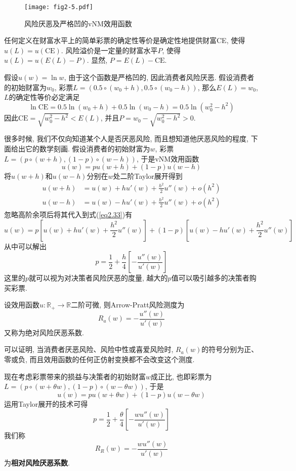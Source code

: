 \documentclass[cn, 12pt, math=mtpro2, bibstyle=apa, blue]{elegantbook}
\newcommand{\R}{\mathbb{R}}
\begin{document}
\begin{figure}[htbp!]
  \centering
  \texttt{[image: fig2-5.pdf]}
  \caption{风险厌恶及严格凹的vNM效用函数}\label{fig2.5}
\end{figure}

\begin{definition}[确定性等价与风险溢价]
任何定义在财富水平上的简单彩票的确定性等价是确定性地提供财富CE, 使得$u(L)=u(\text{CE})$. 风险溢价是一定量的财富水平$P$, 使得$u(L)=u(E(L)-P)$. 显然, $P=E(L)-\text{CE}$.
\end{definition}

\begin{example}
假设$u(w)=\ln w$, 由于这个函数是严格凹的, 因此消费者风险厌恶. 假设消费者的初始财富为$w_0$, 彩票$L=(0.5\circ (w_0+h), 0.5\circ (w_0-h))$, 那么$E(L)=w_0$, $L$的确定性等价必定满足
$$\ln \text{CE}=0.5\ln (w_0+h)+0.5\ln (w_0-h)=0.5\ln (w_0^2-h^2)$$
因此$\text{CE}=\sqrt{w_0^2-h^2}<E(L)$, 并且$P=w_0-\sqrt{w_0^2-h^2}>0$.
\end{example}

很多时候, 我们不仅向知道某个人是否厌恶风险, 而且想知道他厌恶风险的程度, 下面给出它的数学刻画. 假设消费者的初始财富为$w$, 彩票$L=(p\circ (w+h), (1-p)\circ (w-h))$, 于是vNM效用函数
\begin{equation}\label{eq2.33}
  u(w)=pu(w+h)+(1-p)u(w-h)
\end{equation}
将$u(w+h)$和$u(w-h)$分别在$w$处二阶Taylor展开得到
\begin{align*}
u(w+h)&=u(w)+hu'(w)+\frac{h^2}{2}u''(w)+o(h^2) \\
u(w-h)&=u(w)-hu'(w)+\frac{h^2}{2}u''(w)+o(h^2)
\end{align*}
忽略高阶余项后将其代入到式(\ref{eq2.33})有
$$u(w)=p\left[u(w)+hu'(w)+\frac{h^2}{2}u''(w)\right]+(1-p)\left[u(w)-hu'(w)+\frac{h^2}{2}u''(w)\right]$$
从中可以解出
$$p=\frac{1}{2}+\frac{h}{4}\left[-\frac{u''(w)}{u'(w)}\right]$$
这里的$p$就可以视为对决策者风险厌恶的度量, 越大的$p$值可以吸引越多的决策者购买彩票.
\begin{definition}
设效用函数$u:\R_+\to \R$二阶可微, 则Arrow-Pratt风险测度为
$$R_a(w)=-\frac{u''(w)}{u'(w)}$$
又称为绝对风险厌恶系数.
\end{definition}
可以证明, 当消费者厌恶风险、风险中性或喜爱风险时, $R_a(w)$的符号分别为正、零或负, 而且效用函数的任何正仿射变换都不会改变这个测度. 

现在考虑彩票带来的损益与决策者的初始财富$w$成正比, 也即彩票为$L=(p\circ (w+\theta w),(1-p)\circ (w-\theta w))$, 于是
$$u(w)=pu(w+\theta w)+(1-p)u(w-\theta w)$$
运用Taylor展开的技术可得
$$p=\frac{1}{2}+\frac{\theta}{4}\left[-\frac{wu''(w)}{u'(w)}\right]$$
我们称
$$R_R(w)=-\frac{wu''(w)}{u'(w)}$$
为\textbf{相对风险厌恶系数}. 
\end{document}
